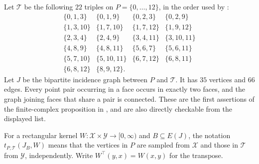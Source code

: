 \documentclass[a4paper,11pt,reqno]{amsart}
\theoremstyle{plain}
\theoremstyle{definition}
\theoremstyle{remark}
\begin{document}
Let $\mathcal T$ be the following $22$ triples on
$P=\{0,\ldots,12\}$, in the order used by \citep{openai161}:
\[
\begin{array}{llll}
\{0,1,3\}&\{0,1,9\}&\{0,2,3\}&\{0,2,9\}\\
\{1,3,10\}&\{1,7,10\}&\{1,7,12\}&\{1,9,12\}\\
\{2,3,4\}&\{2,4,9\}&\{3,4,11\}&\{3,10,11\}\\
\{4,8,9\}&\{4,8,11\}&\{5,6,7\}&\{5,6,11\}\\
\{5,7,10\}&\{5,10,11\}&\{6,7,12\}&\{6,8,11\}\\
\{6,8,12\}&\{8,9,12\}.&&
\end{array}
\]
Let $J$ be the bipartite incidence graph between $P$ and $\mathcal T$.
It has $35$ vertices and $66$ edges.  Every point pair occurring in a
face occurs in exactly two faces, and the graph joining faces that
share a pair is connected.  These are the first assertions of the finite-complex proposition
in \citep[Section~2]{openai161}, and are also directly checkable
from the displayed list.

For a rectangular kernel $W:\mathcal X\times\mathcal Y\to[0,\infty)$
and $B\subseteq E(J)$, the notation $t_{P,\mathcal T}(J_B,W)$
means that the vertices in $P$ are sampled from $\mathcal X$ and
those in $\mathcal T$ from $\mathcal Y$, independently.  Write
$W^\top(y,x)=W(x,y)$ for the transpose.
\end{document}
